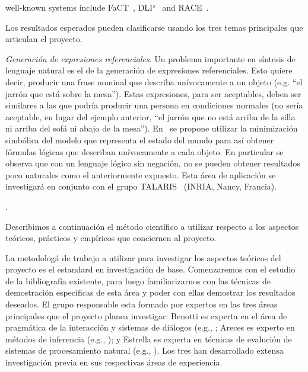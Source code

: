 
\vspace*{.2cm}%


well-known systems include FaCT~\citep{horr:fact99},
DLP~\citep{pate:dlps98} and RACE~\citep{haar:race99}.


Los resultados esperados pueden clasificarse usando los
tres temas principales que articulan el proyecto.



\emph{Generaci\'on de expresiones referenciales}. Un problema importante en
s\'intesis de lenguaje natural es el de la generaci\'on de expresiones referenciales. Esto quiere decir, producir una frase nominal que describa un\'ivocamente a un objeto (e.g. ``el jarr\'on que est\'a sobre la mesa''). Estas expresiones, para ser aceptables, deben ser similares a las que podr\'ia producir una persona en condiciones normales (no ser\'ia aceptable, en lugar del ejemplo anterior, ``el jarr\'on que no est\'a arriba de la silla ni arriba del sof\'a ni abajo de la mesa'').  En~\cite{AKS08} se propone utilizar la minimizaci\'on simb\'olica del modelo que representa
el estado del mundo para as\'i obtener f\'ormulas l\'ogicas que describan
un\'ivocamente a cada objeto. En particular se observa que con un
lenguaje l\'ogico sin negaci\'on, no se pueden obtener resultados poco
naturales como el anteriormente expuesto. Esta \'area de aplicaci\'on se
investigar\'a en conjunto con el grupo TALARIS~\cite{TALARIS} (INRIA,
Nancy, Francia).

\citep{arec:logi00}.





Describimos a continuaci\'on el m\'etodo cient\'ifico a utilizar
respecto a los aspectos te\'oricos, pr\'acticos y emp\'iricos
que conciernen al proyecto.

La metodolog\'a de trabajo a utilizar para investigar los aspectos
te\'oricos del proyecto es el estandard en investigaci\'on de base.
Comenzaremos con el estudio de la bibliograf\'ia existente, para luego
familiarizarnos con las t\'ecnicas de demostraci\'on espec\'ificas de esta
\'area y poder con ellas demostrar los resultados deseados. El grupo
responsable esta formado por expertos en las tres \'areas principales
que el proyecto planea investigar: Benotti es experta en el \'area de
pragm\'atica de la interacci\'on y sistemas de di\'alogos (e.g., \citep{benotti09c,benotti09b}; Areces es
experto en m\'etodos de inferencia (e.g., \citep{}); y Estrella es experta en t\'ecnicas
de evaluci\'on de sistemas de procesamiento natural (e.g., \citep{}).  Los tres han desarrollado extensa investigaci\'on previa en sus respectivas \'areas
de experiencia.

